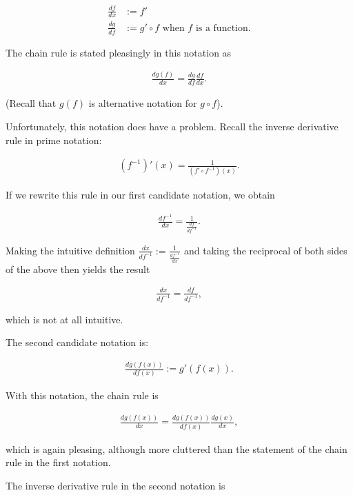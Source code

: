 \begin{align*}
    \frac{df}{dx} &:= f' \\
    \frac{dg}{df} &:= g' \circ f \text{ when $f$ is a function}.
\end{align*}

The chain rule is stated pleasingly in this notation as

\begin{align*}
    \frac{dg(f)}{dx} = \frac{dg}{df} \frac{df}{dx}.
\end{align*}

(Recall that $g(f)$ is alternative notation for $g \circ f$). 

Unfortunately, this notation does have a problem. Recall the inverse derivative rule in prime notation:

\begin{align*}
    (f^{-1})'(x) = \frac{1}{(f' \circ f^{-1})(x)}.
\end{align*}

If we rewrite this rule in our first candidate notation, we obtain

\begin{align*}
    \frac{df^{-1}}{dx} = \frac{1}{\frac{df}{df^{-1}}}.
\end{align*}

Making the intuitive definition $\frac{dx}{df^{-1}} := \frac{1}{\frac{df^{-1}}{dx}}$ and taking the reciprocal of both sides of the above then yields the result

\begin{align*}
    \frac{dx}{df^{-1}} = \frac{df}{df^{-1}},
\end{align*}

which is not at all intuitive.

The second candidate notation is:

\begin{align*}
    \frac{dg(f(x))}{df(x)} := g'(f(x)).
\end{align*}

With this notation, the chain rule is

\begin{align*}
    \frac{dg(f(x))}{dx} = \frac{dg(f(x))}{df(x)} \frac{dg(x)}{dx},
\end{align*}

which is again pleasing, although more cluttered than the statement of the chain rule in the first notation.

The inverse derivative rule in the second notation is

